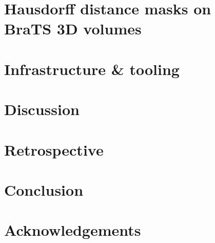\chapter{Hausdorff distance masks on BraTS 3D volumes}


\chapter{Infrastructure \& tooling}


\chapter{Discussion}


\chapter{Retrospective}


\chapter{Conclusion}


\chapter{Acknowledgements}

